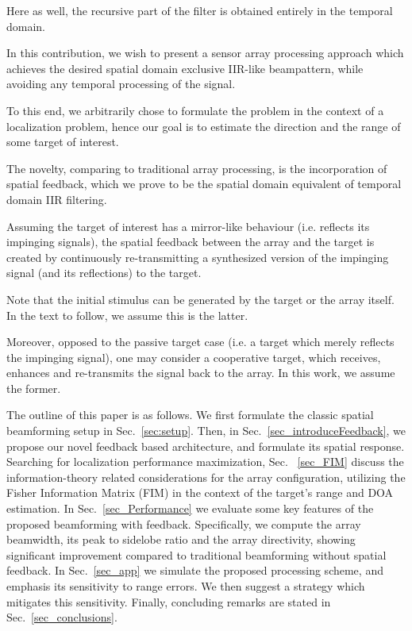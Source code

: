 Here as well, the recursive part of the filter is obtained entirely in the temporal domain.  
\par In this contribution, we wish to present a sensor array processing approach which achieves the desired spatial domain exclusive IIR-like beampattern, while avoiding any temporal processing of the signal.
\par To this end, we arbitrarily chose to formulate the problem in the context of a localization problem, hence our goal is to estimate the direction and the range of some target of interest. 
\par The novelty, comparing to traditional array processing, is the incorporation of spatial feedback, which we prove to be the spatial domain equivalent of temporal domain IIR filtering.
\par Assuming the target of interest has a mirror-like behaviour (i.e. reflects its impinging signals), the spatial feedback between the array and the target is created by continuously re-transmitting a synthesized version of the impinging signal (and its reflections) to the target.
\par Note that the initial stimulus can be generated by the target or the array itself. In the text to follow, we assume this is the latter. 
\par Moreover, opposed to the passive target case (i.e. a target which merely reflects the impinging signal), one may consider a cooperative target, which receives, enhances and re-transmits the signal back to the array. In this work, we assume the former.
\par The outline of this paper is as follows. We first formulate the classic spatial beamforming setup in Sec.~\ref{sec:setup}. Then, in Sec.~\ref{sec_introduceFeedback}, we propose our novel feedback based architecture, and formulate its spatial response.
Searching for localization performance maximization, Sec.~ \ref{sec_FIM} discuss the information-theory related considerations for the array configuration, utilizing the Fisher Information Matrix (FIM) in the context of the target's range and DOA estimation.
In Sec.~\ref{sec_Performance} we evaluate some key features of the proposed beamforming with feedback. Specifically, we compute the array beamwidth, its peak to sidelobe ratio and the array directivity, showing significant improvement compared to traditional beamforming without spatial feedback. 
In Sec.~\ref{sec_app} we simulate the proposed processing scheme, and emphasis its sensitivity to range errors. We then suggest a strategy which mitigates this sensitivity. Finally, concluding remarks are stated in Sec.~\ref{sec_conclusions}.
